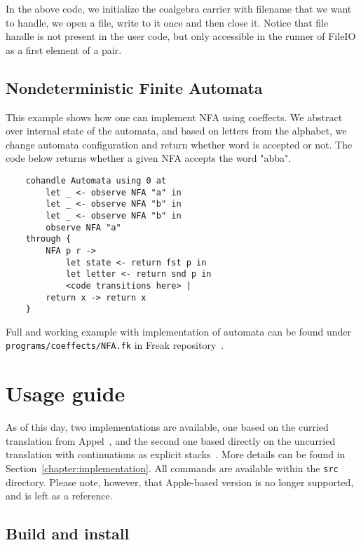 \documentclass[declaration,shortabstract]{iithesis}
\theoremstyle{definition} \newtheorem{definition}{Definition}[chapter]
\theoremstyle{remark} \newtheorem{remark}[definition]{Observation}
\theoremstyle{plain} \newtheorem{theorem}[definition]{Theorem}
\theoremstyle{plain} \newtheorem{lemma}[definition]{Lemma}
\begin{document}
    In the above code, we initialize the coalgebra carrier with filename that
    we want to handle, we open a file, write to it once and then close it. Notice
    that file handle is not present in the user code, but only accessible in
    the runner of FileIO as a first element of a pair.

    \subsection{Nondeterministic Finite Automata}

    This example shows how one can implement NFA using coeffects. We abstract
    over internal state of the automata, and based on letters from the alphabet,
    we change automata configuration and return whether word is accepted or not.
    The code below returns whether a given NFA accepts the word "abba".

\begin{verbatim}
    cohandle Automata using 0 at
        let _ <- observe NFA "a" in
        let _ <- observe NFA "b" in
        let _ <- observe NFA "b" in
        observe NFA "a"
    through {
        NFA p r ->
            let state <- return fst p in
            let letter <- return snd p in
            <code transitions here> |
        return x -> return x
    }
\end{verbatim}

Full and working example with implementation of automata can be found under
\verb!programs/coeffects/NFA.fk! in Freak repository~\cite{freak}.

\section{Usage guide}

    As of this day, two implementations are available, one based on the curried
    translation from Appel~\cite{appel-continuations}, and the second one based
    directly on the uncurried translation with continuations as explicit
    stacks~\cite{handlers-cps-journal}. More details can be found in
    Section~\ref{chapter:implementation}. All commands are available within the
    \verb!src! directory. Please note, however, that Apple-based version is no
    longer supported, and is left as a reference.

    \subsection{Build and install}
\end{document}
